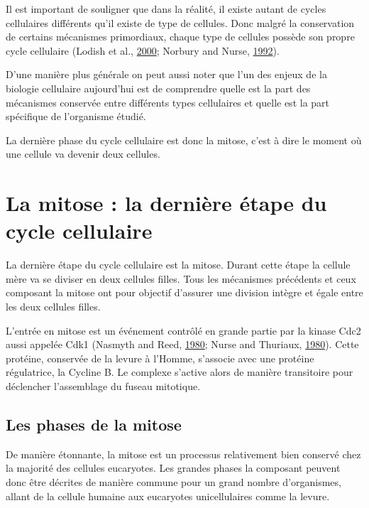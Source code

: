\documentclass[12pt,a4paper,twoside,openright]{book}
\begin{document}
Il est important de souligner que dans la réalité, il existe autant de
cycles cellulaires différents qu'il existe de type de cellules. Donc
malgré la conservation de certains mécanismes primordiaux, chaque type
de cellules possède son propre cycle cellulaire (Lodish et al.,
\protect\hyperlink{ref-Lodish2000}{2000}; Norbury and Nurse,
\protect\hyperlink{ref-Norbury1992}{1992}).

D'une manière plus générale on peut aussi noter que l'un des enjeux de
la biologie cellulaire aujourd'hui est de comprendre quelle est la part
des mécanismes conservée entre différents types cellulaires et quelle
est la part spécifique de l'organisme étudié.

La dernière phase du cycle cellulaire est donc la mitose, c'est à dire
le moment où une cellule va devenir deux cellules.

\section{La mitose : la dernière étape du cycle
cellulaire}\label{la-mitose-la-derniuxe8re-uxe9tape-du-cycle-cellulaire}

La dernière étape du cycle cellulaire est la mitose. Durant cette étape
la cellule mère va se diviser en deux cellules filles. Tous les
mécanismes précédents et ceux composant la mitose ont pour objectif
d'assurer une division intègre et égale entre les deux cellules filles.

L'entrée en mitose est un événement contrôlé en grande partie par la
kinase Cdc2 aussi appelée Cdk1 (Nasmyth and Reed,
\protect\hyperlink{ref-Nasmyth1980}{1980}; Nurse and Thuriaux,
\protect\hyperlink{ref-Nurse1980}{1980}). Cette protéine, conservée de
la levure à l'Homme, s'associe avec une protéine régulatrice, la Cycline
B. Le complexe s'active alors de manière transitoire pour déclencher
l'assemblage du fuseau mitotique.

\subsection{Les phases de la mitose}\label{les-phases-de-la-mitose}

De manière étonnante, la mitose est un processus relativement bien
conservé chez la majorité des cellules eucaryotes. Les grandes phases la
composant peuvent donc être décrites de manière commune pour un grand
nombre d'organismes, allant de la cellule humaine aux eucaryotes
unicellulaires comme la levure.
\end{document}
